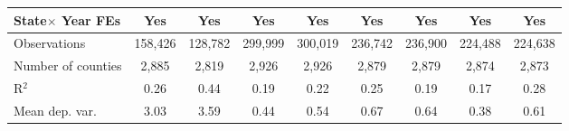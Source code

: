 {\begin{tabular}{l*{8}{c}}
\addlinespace
State$\times$ Year FEs &         Yes         &         Yes         &         Yes         &         Yes         &         Yes         &         Yes         &         Yes         &         Yes         \\
\midrule
Observations        &     158,426         &     128,782         &     299,999         &     300,019         &     236,742         &     236,900         &     224,488         &     224,638         \\
Number of counties  &       2,885         &       2,819         &       2,926         &       2,926         &       2,879         &       2,879         &       2,874         &       2,873         \\
R$^2$               &        0.26         &        0.44         &        0.19         &        0.22         &        0.25         &        0.19         &        0.17         &        0.28         \\
Mean dep. var.      &        3.03         &        3.59         &        0.44         &        0.54         &        0.67         &        0.64         &        0.38         &        0.61         \\
\bottomrule
\end{tabular}
}
